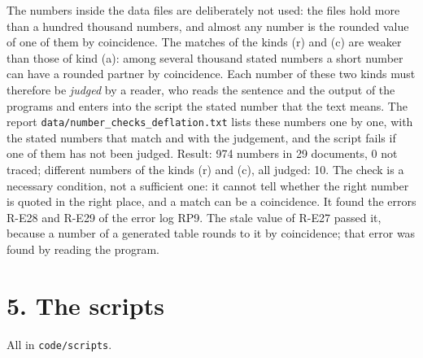 \documentclass[
  10pt,
]{article}
\begin{document}
The numbers inside the data files are deliberately not used: the files
hold more than a hundred thousand numbers, and almost any number is the
rounded value of one of them by coincidence. The matches of the kinds
(r) and (c) are weaker than those of kind (a): among several thousand
stated numbers a short number can have a rounded partner by coincidence.
Each number of these two kinds must therefore be \emph{judged} by a
reader, who reads the sentence and the output of the programs and enters
into the script the stated number that the text means. The report
\texttt{data/number\_checks\_deflation.txt} lists these numbers one by
one, with the stated numbers that match and with the judgement, and the
script fails if one of them has not been judged. Result: 974 numbers in
29 documents, 0 not traced; different numbers of the kinds (r) and (c),
all judged: 10. The check is a necessary condition, not a sufficient
one: it cannot tell whether the right number is quoted in the right
place, and a match can be a coincidence. It found the errors R-E28 and
R-E29 of the error log RP9. The stale value of R-E27 passed it, because
a number of a generated table rounds to it by coincidence; that error
was found by reading the program.

\hypertarget{the-scripts}{%
\section{5. The scripts}\label{the-scripts}}

All in \texttt{code/scripts}.
\end{document}
